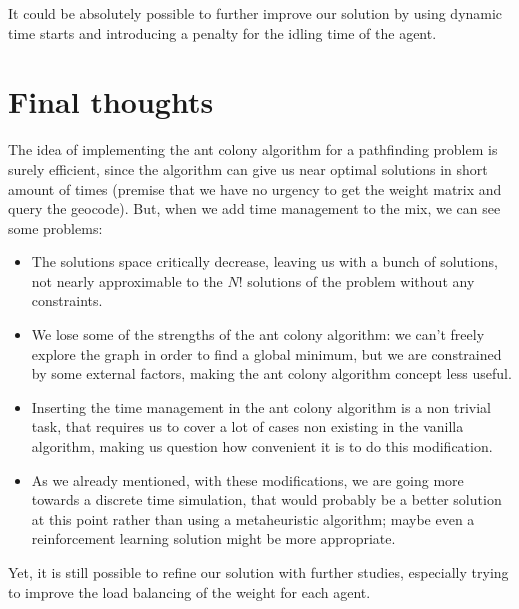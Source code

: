 \documentclass[titlepage]{article}
\begin{document}
It could be absolutely possible to further improve our solution by using dynamic time starts and introducing a penalty for the idling time of the agent.

\section{Final thoughts}
The idea of implementing the ant colony algorithm for a pathfinding problem is surely efficient, since the algorithm can give us near optimal solutions in short amount of times (premise that we have no urgency to get the weight matrix and query the geocode). But, when we add time management to the mix, we can see some problems:
\begin{itemize}
    \item The solutions space critically decrease, leaving us with a bunch of solutions, not nearly approximable to the $N!$ solutions of the problem without any constraints.
    \item We lose some of the strengths of the ant colony algorithm: we can't freely explore the graph in order to find a global minimum, but we  are constrained by some external factors, making the ant colony algorithm concept less useful.
    \item Inserting the time management in the ant colony algorithm is a non trivial task, that requires us to cover a lot of cases non existing in the vanilla algorithm, making us question how convenient it is to do this modification.
    \item As we already mentioned, with these modifications, we are going more towards a discrete time simulation, that would probably be a better solution at this point rather than using a metaheuristic algorithm; maybe even a reinforcement learning solution might be more appropriate.
\end{itemize}

Yet, it is still possible to refine our solution with further studies, especially trying to improve the load balancing of the weight for each agent.
\end{document}
